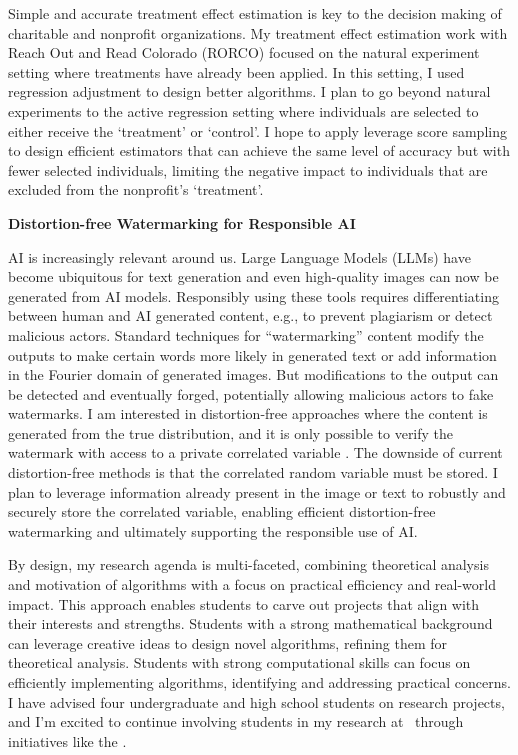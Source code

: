 \documentclass[11pt]{article}
\begin{document}
{Simple and accurate treatment effect estimation is key to the decision making of charitable and nonprofit organizations. My treatment effect estimation work with Reach Out and Read Colorado (RORCO) focused on the natural experiment setting where treatments have already been applied. In this setting, I used regression adjustment to design better algorithms. I plan to go beyond natural experiments to the active regression setting where individuals are selected to either receive the ‘treatment’ or ‘control’. I hope to apply leverage score sampling to design efficient estimators that can achieve the same level of accuracy but with fewer selected individuals, limiting the negative impact to individuals that are excluded from the nonprofit’s `treatment’.

{\large \textbf{Distortion-free Watermarking for Responsible AI}}

AI is increasingly relevant around us. Large Language Models (LLMs) have become ubiquitous for text generation and even high-quality images can now be generated from AI models. Responsibly using these tools requires differentiating between human and AI generated content, e.g., to prevent plagiarism or detect malicious actors. Standard techniques for “watermarking” content modify the outputs to make certain words more likely in generated text or add information in the Fourier domain of generated images. But modifications to the output can be detected and eventually forged, potentially allowing malicious actors to fake watermarks. I am interested in distortion-free approaches where the content is generated from the true distribution, and it is only possible to verify the watermark with access to a private correlated variable \cite{arabi2024hidden}. The downside of current distortion-free methods is that the correlated random variable must be stored. I plan to leverage information already present in the image or text to robustly and securely store the correlated variable, enabling efficient distortion-free watermarking and ultimately supporting the responsible use of AI.

By design, my research agenda is multi-faceted, combining theoretical analysis and motivation of algorithms with a focus on practical efficiency and real-world impact. This approach enables students to carve out projects that align with their interests and strengths. Students with a strong mathematical background can leverage creative ideas to design novel algorithms, refining them for theoretical analysis. Students with strong computational skills can focus on efficiently implementing algorithms, identifying and addressing practical concerns. I have advised four undergraduate and high school students on research projects, and I'm excited to continue involving students in my research at \school~through initiatives like the \program.

}
\end{document}
